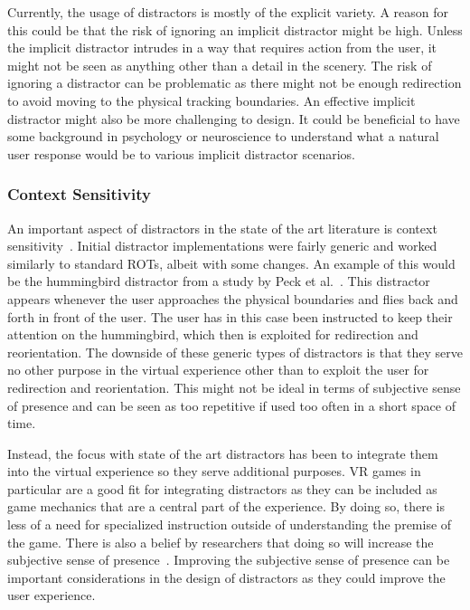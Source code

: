 Currently, the usage of distractors is mostly of the explicit variety. A reason for this could be that the risk of ignoring an implicit distractor might be high. Unless the implicit distractor intrudes in a way that requires action from the user, it might not be seen as anything other than a detail in the scenery. The risk of ignoring a distractor can be problematic as there might not be enough redirection to avoid moving to the physical tracking boundaries. An effective implicit distractor might also be more challenging to design. It could be beneficial to have some background in psychology or neuroscience to understand what a natural user response would be to various implicit distractor scenarios.  

\subsubsection{Context Sensitivity}
An important aspect of distractors in the state of the art literature is context sensitivity~\cite{chen2017towards, chen2017supporting, sra2018vmotion}. Initial distractor implementations were fairly generic and worked similarly to standard ROTs, albeit with some changes. An example of this would be the hummingbird distractor from a study by Peck et al.~\cite{peck2011evaluation}. This distractor appears whenever the user approaches the physical boundaries and flies back and forth in front of the user. The user has in this case been instructed to keep their attention on the hummingbird, which then is exploited for redirection and reorientation. The downside of these generic types of distractors is that they serve no other purpose in the virtual experience other than to exploit the user for redirection and reorientation. This might not be ideal in terms of subjective sense of presence and can be seen as too repetitive if used too often in a short space of time. 

Instead, the focus with state of the art distractors has been to integrate them into the virtual experience so they serve additional purposes. VR games in particular are a good fit for integrating distractors as they can be included as game mechanics that are a central part of the experience. By doing so, there is less of a need for specialized instruction outside of understanding the premise of the game. There is also a belief by researchers that doing so will increase the subjective sense of presence~\cite{chen2017supporting, sra2018vmotion}. Improving the subjective sense of presence can be important considerations in the design of distractors as they could improve the user experience. 


